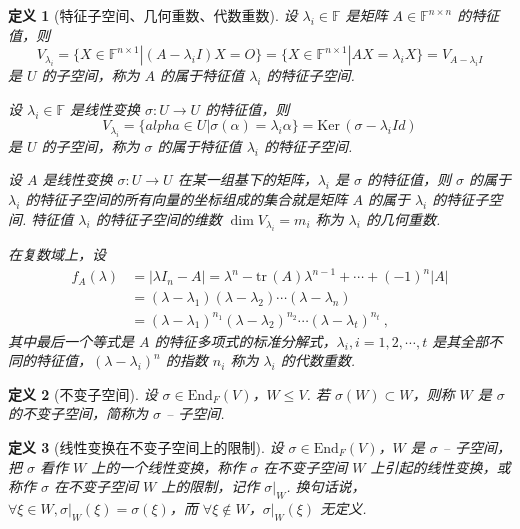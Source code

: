 \documentclass[zihao=-4,UTF8,linespread=1.8,nothm]{aytony_base}
\newtheorem{definition}{\indent 定义}[subsection]
\begin{document}
\begin{definition}[特征子空间、几何重数、代数重数]
    设 $\lambda_i \in \mathbb{F}$ 是矩阵 $A \in \mathbb{F}^{n \times n}$ 的特征值，则 $$
        V_{\lambda_i} = \{X \in \mathbb{F}^{n \times 1}|(A - \lambda_i I)X = O\} = \{X \in \mathbb{F}^{n \times 1} | AX = \lambda_iX\} = V_{A - \lambda_iI}
    $$ 是 $U$ 的子空间，称为 $A$ 的属于特征值 $\lambda_i$ 的特征子空间.

    设 $\lambda_i \in \mathbb{F}$ 是线性变换 $\sigma:U \to U$ 的特征值，则 $$
        V_{\lambda_i} = \{alpha \in U|\sigma(\alpha) = \lambda_i\alpha\} = \mathrm{Ker}\,(\sigma - \lambda_iId)
    $$ 是 $U$ 的子空间，称为 $\sigma$ 的属于特征值 $\lambda_i$ 的特征子空间.

    设 $A$ 是线性变换 $\sigma:U \to U$ 在某一组基下的矩阵，$\lambda_i$ 是 $\sigma$ 的特征值，则 $\sigma$ 的属于 $\lambda_i$ 的特征子空间的所有向量的坐标组成的集合就是矩阵 $A$ 的属于 $\lambda_i$ 的特征子空间. 特征值 $\lambda_i$ 的特征子空间的维数 $\dim V_{\lambda_i} = m_i$ 称为 $\lambda_i$ 的几何重数.

    在复数域上，设 $$
        \begin{aligned}
            f_A(\lambda) & = |\lambda I_n - A| = \lambda^n - \mathrm{tr}\,(A) \lambda^{n-1} + \cdots + (-1)^n|A|        \\
                         & = (\lambda - \lambda_1)(\lambda - \lambda_2)\cdots(\lambda - \lambda_n)                      \\
                         & = (\lambda - \lambda_1)^{n_1}(\lambda - \lambda_2)^{n_2}\cdots(\lambda - \lambda_t)^{n_t}\ ,
        \end{aligned}$$ 其中最后一个等式是 $A$ 的特征多项式的标准分解式，$\lambda_i, i = 1, 2, \cdots, t$ 是其全部不同的特征值，$(\lambda - \lambda_i)^n$ 的指数 $n_i$ 称为 $\lambda_i$ 的代数重数.
\end{definition}

\begin{definition}[不变子空间]
    设 $\sigma \in \mathrm{End}_F(V)$，$W \leqslant V$. 若 $\sigma(W) \subset W$，则称 $W$ 是 $\sigma$ 的不变子空间，简称为 $\sigma$ -- 子空间.
\end{definition}

\begin{definition}[线性变换在不变子空间上的限制]
    设 $\sigma \in \mathrm{End}_F(V)$，$W$ 是 $\sigma$ -- 子空间，把 $\sigma$ 看作 $W$ 上的一个线性变换，称作 $\sigma$ 在不变子空间 $W$ 上引起的线性变换，或称作 $\sigma$ 在不变子空间 $W$ 上的限制，记作 $\sigma |_W$. 换句话说，$\forall \xi \in W, \sigma|_{W}(\xi) = \sigma(\xi)$，而 $\forall \xi \notin W$，$\sigma|_W(\xi)$ 无定义.
\end{definition}
\end{document}
